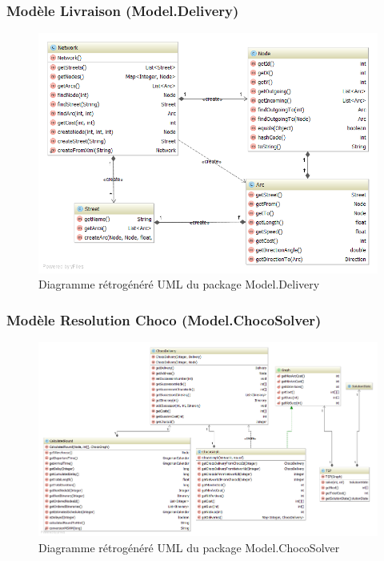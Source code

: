 \subsubsection{Mod\`ele Livraison (Model.Delivery)}

\begin{figure}[h]
    \centering
    \includegraphics[width=160mm]{../diagrams/classes_packages/final_classes_packages/model/delivery.png}
    \caption{Diagramme r\'etrog\'en\'er\'e UML du package Model.Delivery}
    \label{diagram:gen_uml_model_delivery}
\end{figure}
\pagebreak

\begin{landscape}
\subsubsection{Mod\`ele Resolution Choco (Model.ChocoSolver)}

\begin{figure}[h]
    \centering
    \includegraphics[width=200mm]{../diagrams/classes_packages/final_classes_packages/model/chocoSolver.png}
    \caption{Diagramme r\'etrog\'en\'er\'e UML du package Model.ChocoSolver}
    \label{diagram:gen_uml_model_choco}
\end{figure}
\end{landscape}
\pagebreak

